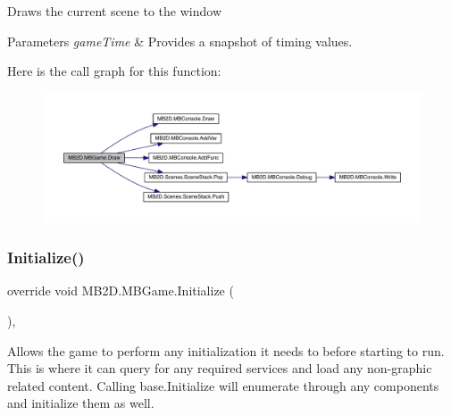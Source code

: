 Draws the current scene to the window 


\begin{DoxyParams}{Parameters}
{\em game\+Time} & Provides a snapshot of timing values.\\
\hline
\end{DoxyParams}
Here is the call graph for this function\+:
\nopagebreak
\begin{figure}[H]
\begin{center}
\leavevmode
\includegraphics[width=350pt]{class_m_b2_d_1_1_m_b_game_ad791072c4d2a5b23bbaec3542d6facc9_cgraph}
\end{center}
\end{figure}
\hypertarget{class_m_b2_d_1_1_m_b_game_a2157be479c1831c49301cd472cc01cde}{}\label{class_m_b2_d_1_1_m_b_game_a2157be479c1831c49301cd472cc01cde} 
\subsubsection{\texorpdfstring{Initialize()}{Initialize()}}
{\footnotesize\ttfamily override void M\+B2\+D.\+M\+B\+Game.\+Initialize (\begin{DoxyParamCaption}{ }\end{DoxyParamCaption})\hspace{0.3cm}{\ttfamily [inline]}, {\ttfamily [protected]}}



Allows the game to perform any initialization it needs to before starting to run. This is where it can query for any required services and load any non-\/graphic related content. Calling base.\+Initialize will enumerate through any components and initialize them as well. 

